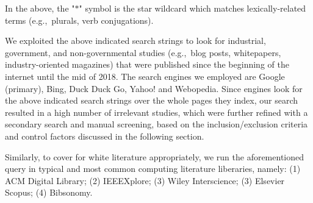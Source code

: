 In the above, the "$\texttt{*}$" symbol is the star wildcard which matches lexically-related terms (e.g.,~plurals, verb conjugations).

We exploited the above indicated search strings to look for industrial, government, and non-governmental studies (e.g.,~blog posts, whitepapers, industry-oriented magazines) that were published since the beginning of the internet until the mid of 2018. 
The search engines we employed are Google (primary), Bing, Duck Duck Go, Yahoo! and Webopedia.  Since engines look for the above indicated search strings over the whole pages they index, our search resulted in a high number of irrelevant studies, which were further refined with a secondary search and manual screening, based on the inclusion/exclusion criteria and control factors discussed in the following section. 

Similarly, to cover for white literature appropriately, we run the aforementioned query in typical and most common computing literature liberaries, namely: (1) ACM Digital Library; (2) IEEEXplore; (3) Wiley Interscience; (3) Elsevier Scopus; (4) Bibsonomy.

